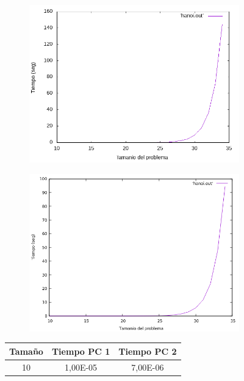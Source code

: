\documentclass[12pt,spanish]{article}
\begin{document}
\begin{figure}[H]
\centering
\begin{subfigure}[b]{0.45\textwidth}
\includegraphics[scale=0.45]{empirica_hanoi.png}
\caption{}
\end{subfigure}
\quad
\begin{subfigure}[b]{0.45\textwidth}
\includegraphics[scale=0.45]{empirica_hanoi_2.png}
\caption{}
\end{subfigure}
\begin{tabular}{|c|c|c|}
\hline
\textbf{Tamaño} & \textbf{Tiempo PC 1} & \textbf{Tiempo PC 2} \\
\hline
10 & 1,00E-05 & 7,00E-06\\

\end{tabular}
\end{figure}
\end{document}
